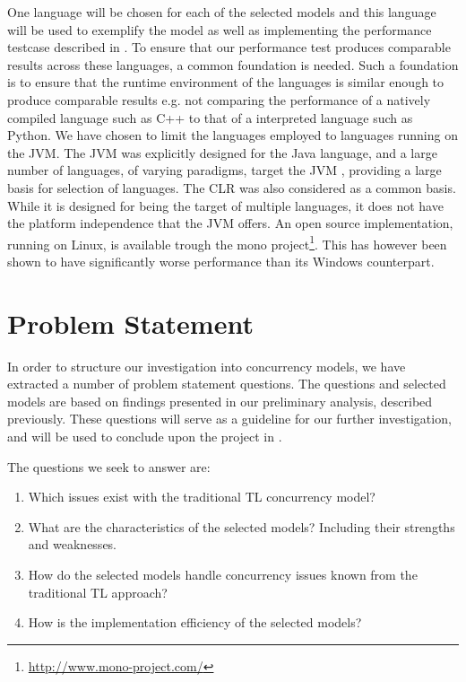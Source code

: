 One language will be chosen for each of the selected models and this language will be used to exemplify the model as well as implementing the performance testcase described in . To ensure that our performance test produces comparable results across these languages, a common foundation is needed. Such a foundation is to ensure that the runtime environment of the languages is similar enough to produce comparable results e.g. not comparing the performance of a natively compiled language such as C++ to that of a interpreted language such as Python. We have chosen to limit the languages employed to languages running on the \ac{JVM}. The \ac{JVM} was explicitly designed for the Java language, and a large number of languages, of varying paradigms, target the \ac{JVM} \cite[p. 1]{singer2003jvm}, providing a large basis for selection of languages. The \ac{CLR} was also considered as a common basis. While it is designed for being the target of multiple languages, it does not have the platform independence that the \ac{JVM} offers. An open source implementation, running on Linux, is available trough the mono project\footnote{\url{http://www.mono-project.com/}}. This has however been shown to have significantly worse performance than its Windows counterpart\cite[p. 59]{totoo2012haskell}.

\section{Problem Statement}\label{sec:problemstatement}
In order to structure our investigation into concurrency models, we have extracted a number of problem statement questions. The questions and selected models are based on findings presented in our preliminary analysis, described previously. These questions will serve as a guideline for our further investigation, and will be used to conclude upon the project in .

The questions we seek to answer are:
\begin{enumerate}
\item Which issues exist with the traditional \ac{TL} concurrency model?
\item What are the characteristics of the selected models? Including their strengths and weaknesses.
\item How do the selected models handle concurrency issues known from the traditional \ac{TL} approach?
\item How is the implementation efficiency of the selected models?
\end{enumerate}

